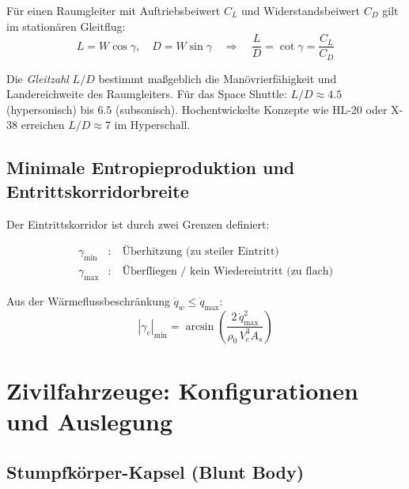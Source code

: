 ﻿\documentclass[12pt,a4paper]{article}
\begin{document}
Für einen Raumgleiter mit Auftriebsbeiwert $C_L$ und Widerstandsbeiwert $C_D$
gilt im stationären Gleitflug:
\[
  L = W\cos\gamma, \quad D = W\sin\gamma
  \quad\Rightarrow\quad
  \frac{L}{D} = \cot\gamma = \frac{C_L}{C_D}
\]

Die \emph{Gleitzahl} $L/D$ bestimmt maßgeblich die Manövrierfähigkeit und
Landereichweite des Raumgleiters. Für das Space Shuttle: $L/D \approx 4.5$
(hypersonisch) bis $6.5$ (subsonisch). Hochentwickelte Konzepte wie HL-20 oder
X-38 erreichen $L/D \approx 7$ im Hyperschall.

\subsection{Minimale Entropieproduktion und Entrittskorridorbreite}

Der Eintrittskorridor ist durch zwei Grenzen definiert:

\begin{align}
  \gamma_{\min} &: \quad \text{Überhitzung (zu steiler Eintritt)} \\
  \gamma_{\max} &: \quad \text{Überfliegen / kein Wiedereintritt (zu flach)}
\end{align}

Aus der Wärmeflussbeschränkung $\dot{q}_w \leq \dot{q}_{\max}$:
\[
  |\gamma_e|_{\min} = \arcsin\!\left(\frac{2\,\dot{q}_{\max}^2}{\rho_0\,V_e^3 A_s}\right)
\]

\section{Zivilfahrzeuge: Konfigurationen und Auslegung}

\subsection{Stumpfkörper-Kapsel (Blunt Body)}
\end{document}
